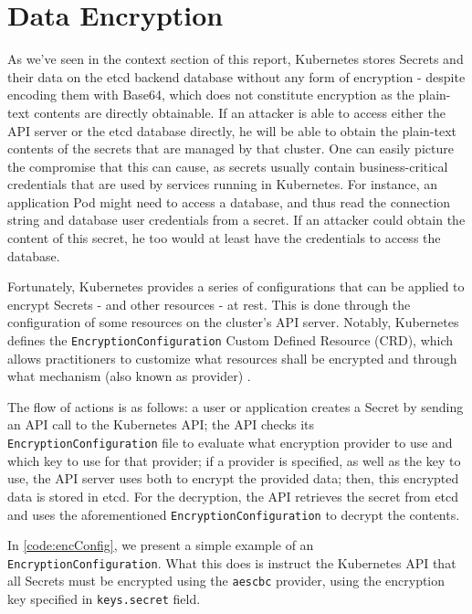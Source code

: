\documentclass[a4paper,11pt,openright,BCOR=15mm]{scrbook}
\begin{document}
	\section{Data Encryption}\label{sect:data}
	
As we've seen in the context section of this report, Kubernetes stores Secrets and their data on the etcd backend database without any form of encryption \cite{the_linux_foundation_secrets_2024} - despite encoding them with Base64, which does not constitute encryption as the plain-text contents are directly obtainable. If an attacker is able to access either the API server or the etcd database directly, he will be able to obtain the plain-text contents of the secrets that are managed by that cluster. One can easily picture the compromise that this can cause, as secrets usually contain business-critical credentials that are used by services running in Kubernetes. For instance, an application Pod might need to access a database, and thus read the connection string and database user credentials from a secret. If an attacker could obtain the content of this secret, he too would at least have the credentials to access the database.

Fortunately, Kubernetes provides a series of configurations that can be applied to encrypt Secrets - and other resources - at rest. This is done through the configuration of some resources on the cluster's API server. Notably, Kubernetes defines the \texttt{EncryptionConfiguration} Custom Defined Resource (CRD), which allows practitioners to customize what resources shall be encrypted and through what mechanism (also known as provider) \cite{the_linux_foundation_encrypting_2024}.

The flow of actions is as follows: a user or application creates a Secret by sending an API call to the Kubernetes API; the API checks its \texttt{EncryptionConfiguration} file to evaluate what encryption provider to use and which key to use for that provider; if a provider is specified, as well as the key to use, the API server uses both to encrypt the provided data; then, this encrypted data is stored in etcd. For the decryption, the API retrieves the secret from etcd and uses the aforementioned \texttt{EncryptionConfiguration} to decrypt the contents.

In \ref{code:encConfig}, we present a simple example of an \texttt{EncryptionConfiguration}. What this does is instruct the Kubernetes API that all Secrets must be encrypted using the \texttt{aescbc} provider, using the encryption key specified in \texttt{keys.secret} field.
\end{document}
